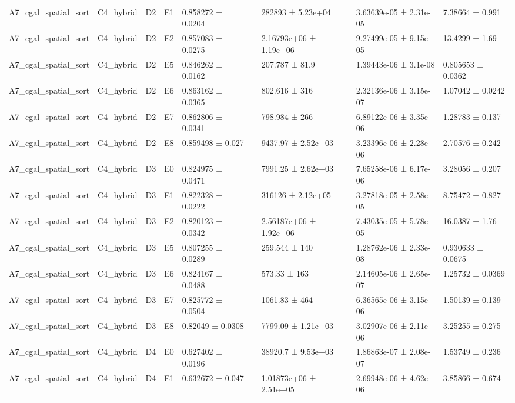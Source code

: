 \begin{table}
\begin{tabular}{lllllllll}
A7\_cgal\_spatial\_sort & C4\_hybrid & D2 & E1 & 0.858272 ± 0.0204 &  & 282893 ± 5.23e+04 & 3.63639e-05 ± 2.31e-05 & 7.38664 ± 0.991 \\
A7\_cgal\_spatial\_sort & C4\_hybrid & D2 & E2 & 0.857083 ± 0.0275 &  & 2.16793e+06 ± 1.19e+06 & 9.27499e-05 ± 9.15e-05 & 13.4299 ± 1.69 \\
A7\_cgal\_spatial\_sort & C4\_hybrid & D2 & E5 & 0.846262 ± 0.0162 &  & 207.787 ± 81.9 & 1.39443e-06 ± 3.1e-08 & 0.805653 ± 0.0362 \\
A7\_cgal\_spatial\_sort & C4\_hybrid & D2 & E6 & 0.863162 ± 0.0365 &  & 802.616 ± 316 & 2.32136e-06 ± 3.15e-07 & 1.07042 ± 0.0242 \\
A7\_cgal\_spatial\_sort & C4\_hybrid & D2 & E7 & 0.862806 ± 0.0341 &  & 798.984 ± 266 & 6.89122e-06 ± 3.35e-06 & 1.28783 ± 0.137 \\
A7\_cgal\_spatial\_sort & C4\_hybrid & D2 & E8 & 0.859498 ± 0.027 &  & 9437.97 ± 2.52e+03 & 3.23396e-06 ± 2.28e-06 & 2.70576 ± 0.242 \\
A7\_cgal\_spatial\_sort & C4\_hybrid & D3 & E0 & 0.824975 ± 0.0471 &  & 7991.25 ± 2.62e+03 & 7.65258e-06 ± 6.17e-06 & 3.28056 ± 0.207 \\
A7\_cgal\_spatial\_sort & C4\_hybrid & D3 & E1 & 0.822328 ± 0.0222 &  & 316126 ± 2.12e+05 & 3.27818e-05 ± 2.58e-05 & 8.75472 ± 0.827 \\
A7\_cgal\_spatial\_sort & C4\_hybrid & D3 & E2 & 0.820123 ± 0.0342 &  & 2.56187e+06 ± 1.92e+06 & 7.43035e-05 ± 5.78e-05 & 16.0387 ± 1.76 \\
A7\_cgal\_spatial\_sort & C4\_hybrid & D3 & E5 & 0.807255 ± 0.0289 &  & 259.544 ± 140 & 1.28762e-06 ± 2.33e-08 & 0.930633 ± 0.0675 \\
A7\_cgal\_spatial\_sort & C4\_hybrid & D3 & E6 & 0.824167 ± 0.0488 &  & 573.33 ± 163 & 2.14605e-06 ± 2.65e-07 & 1.25732 ± 0.0369 \\
A7\_cgal\_spatial\_sort & C4\_hybrid & D3 & E7 & 0.825772 ± 0.0504 &  & 1061.83 ± 464 & 6.36565e-06 ± 3.15e-06 & 1.50139 ± 0.139 \\
A7\_cgal\_spatial\_sort & C4\_hybrid & D3 & E8 & 0.82049 ± 0.0308 &  & 7799.09 ± 1.21e+03 & 3.02907e-06 ± 2.11e-06 & 3.25255 ± 0.275 \\
A7\_cgal\_spatial\_sort & C4\_hybrid & D4 & E0 & 0.627402 ± 0.0196 &  & 38920.7 ± 9.53e+03 & 1.86863e-07 ± 2.08e-07 & 1.53749 ± 0.236 \\
A7\_cgal\_spatial\_sort & C4\_hybrid & D4 & E1 & 0.632672 ± 0.047 &  & 1.01873e+06 ± 2.51e+05 & 2.69948e-06 ± 4.62e-06 & 3.85866 ± 0.674 \\

\end{tabular}
\end{table}

